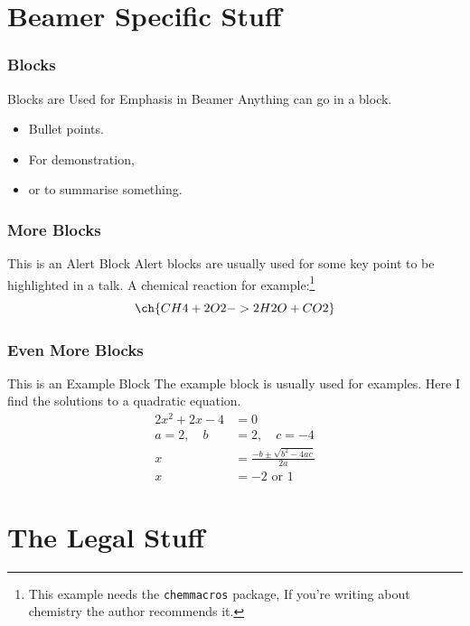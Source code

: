 \documentclass[aspectratio=169]{beamer}
\begin{document}
\section{Beamer Specific Stuff}
\begin{frame}
\frametitle{Blocks}
   \begin{block}{Blocks are Used for Emphasis in Beamer}
      Anything can go in a block.
      \begin{itemize}
         \item Bullet points.
         \item For demonstration,
         \item or to summarise something.
      \end{itemize}
   \end{block}
\end{frame}


\begin{frame}
\frametitle{More Blocks}
   \begin{alertblock}{This is an Alert Block}
      Alert blocks are usually used for some key point to be highlighted in a talk.
      A chemical reaction for example:\footnote{This example needs the \texttt{chemmacros} package, If you're writing about chemistry the author recommends it.}
      \begin{equation}
         \ch{CH4 + 2 O2 -> 2 H2O + CO2}
      \end{equation}
   \end{alertblock}
\end{frame}


\begin{frame}
\frametitle{Even More Blocks}
   \begin{exampleblock}{This is an Example Block}
      The example block is usually used for examples. Here I find the solutions to a quadratic equation.
      \begin{align*}
         2x^2 + 2x - 4 & = 0 \\
         a=2, \quad b & =2, \quad c=-4\\
         x & =\frac{-b\pm\sqrt{b^2-4ac}}{2a} \\
         x & =-2 \text{ or } 1
      \end{align*}
   \end{exampleblock}
\end{frame}


\section{The Legal Stuff}
\end{document}
